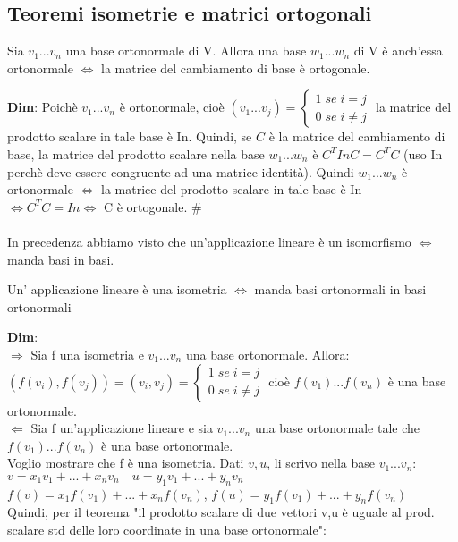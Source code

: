 \documentclass[12pt]{article}
\begin{document}
\subsection{Teoremi isometrie e matrici ortogonali}
\begin{theorem}[T.1]
Sia $v_1...v_n$ una base ortonormale di V. Allora una base $w_1...w_n$ di V è anch'essa ortonormale $\iff$ la matrice del cambiamento di base è ortogonale.
\end{theorem}
\textbf{Dim}: Poichè $v_1...v_n$ è ortonormale, cioè $(v_1...v_j) = \begin{cases}
    1 \;se\; i=j\\
    0 \; se\; i\neq j
\end{cases}$ la matrice del prodotto scalare in tale base è In. Quindi, se $C$ è la matrice del cambiamento di base, la matrice del prodotto scalare nella base $w_1...w_n$ è $C^TInC = C^TC$ (uso In perchè deve essere congruente ad una matrice identità). Quindi $w_1...w_n$ è ortonormale $\iff$ la matrice del prodotto scalare in tale base è In $\iff C^TC = In \iff$ C è ortogonale. $\#$\\\\
In precedenza abbiamo visto che un'applicazione lineare è un isomorfismo $\iff$ manda basi in basi.\\
\begin{theorem}[T.2]
Un' applicazione lineare è una isometria $\iff$ manda basi ortonormali in basi ortonormali
\end{theorem}
\textbf{Dim}:\\
$\Rightarrow$ Sia f una isometria e $v_1...v_n$ una base ortonormale. Allora:\\
$(f(v_i), f(v_j)) = (v_i,v_j) = \begin{cases}
    1\; se\; i = j\\
    0\; se \; i\neq j
\end{cases}$ cioè $f(v_1)...f(v_n)$ è una base ortonormale.\\
$\Leftarrow$ Sia f un'applicazione lineare e sia $v_1...v_n$ una base ortonormale tale che $f(v_1)...f(v_n)$ è una base ortonormale.\\
Voglio mostrare che f è una isometria. Dati $v,u$, li scrivo nella base $v_1...v_n$:\\
$v = x_1v_1+...+x_nv_n\quad u = y_1v_1+...+y_nv_n$\\
$f(v) = x_1f(v_1)+...+x_nf(v_n)$, $f(u) = y_1f(v_1)+...+y_nf(v_n)$\\
Quindi, per il teorema "il prodotto scalare di due vettori v,u è uguale al prod. scalare std delle loro coordinate in una base ortonormale":\\
\end{document}
